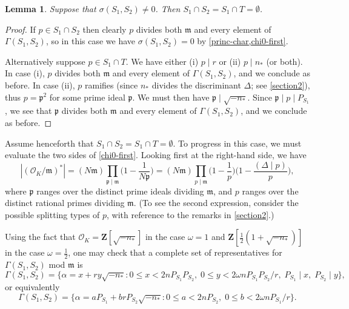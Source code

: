 \documentclass[11pt,reqno]{amsart}
\numberwithin{equation}{section}
\newtheorem{lemma}[theorem]{Lemma}
\theoremstyle{definition}
\theoremstyle{remark}
\newcommand{\mf}{\mathfrak}
\renewcommand{\le}{\leqslant}
\newcommand\Z{\mathbf{Z}}
\newcommand{\legendre}[2]{(#1 \mid #2)}
\renewcommand\O{\mathcal{O}}
\begin{document}
\begin{lemma}\label{es1s2-small-lemma}
Suppose that $\sigma(S_1, S_2) \neq 0$. Then $S_1 \cap S_2  = S_1 \cap T = \emptyset$.
\end{lemma}
\begin{proof}
If $p \in S_1 \cap S_2$ then clearly $p$ divides both $\mf{m}$ and every element of $\Gamma(S_1, S_2)$, so in this case we have $\sigma(S_1, S_2) = 0$ by \cref{princ-char,chi0-first}.

Alternatively suppose $p \in S_1 \cap T$.  We have either (i) $p \mid r$ or (ii) $p \mid n_*$ (or both). In case (i), $p$ divides both $\mf{m}$ and every element of $\Gamma(S_1, S_2)$, and we conclude as before. In case (ii), $p$ ramifies (since $n_*$ divides the discriminant $\Delta$; see \cref{section2}), thus $p = \mf{p}^2$ for some prime ideal $\mf{p}$. We must then have $\mf{p} \mid \sqrt{-n_*}$. Since $\mf{p} \mid p \mid P_{S_1}$, we see that $\mf{p}$ divides both $\mf{m}$ and every element of $\Gamma(S_1, S_2)$, and we conclude as before.
\end{proof}

Assume henceforth that $S_1 \cap S_2 = S_1 \cap T = \emptyset$. To progress in this case, we must evaluate the two sides of \cref{chi0-first}. Looking first at the right-hand side, we have 
\begin{equation}\label{chinese-rem}
 |(\O_K/\mf{m})^*|  =  (N\mf{m})  \prod_{\mf{p} \mid \mf{m}} \Big(1 - \frac{1}{N\mf{p}}\Big) = (N\mf{m}) \prod_{p \mid \mf{m}} \Big(1 - \frac{1}{p}\Big) \bigg(1 - \frac{\legendre{\Delta}{p}}{p}\bigg),
 \end{equation} where $\mf{p}$ ranges over the distinct prime ideals dividing $\mf{m}$, and $p$ ranges over the distinct rational primes dividing $\mf{m}$. (To see the second expression, consider the possible splitting types of $p$, with reference to the remarks in \cref{section2}.)
 
Using the fact that $\O_K = \Z[\sqrt{-n_*}]$ in the case $\omega = 1$ and $\Z[\frac{1}{2}(1 + \sqrt{-n_*})]$ in the case $\omega = \frac{1}{2}$, one may check that a complete set of representatives for $\Gamma(S_1, S_2)$ mod $\mf{m}$ is
\[ \Gamma(S_1, S_2) = \{ \alpha = x + ry \sqrt{-n_*} : 0 \le x < 2n P_{S_1} P_{S_2}, \; 0 \le y < 2\omega  nP_{S_1} P_{S_2}/ r, \; P_{S_1} \mid x, \; P_{S_2} \mid y\},\] or equivalently
\begin{equation}\label{gs1s2-explicit} \Gamma(S_1, S_2) = \{ \alpha = aP_{S_1} + br P_{S_2} \sqrt{-n_*} : 0 \le a < 2n P_{S_2}, \; 0 \le b < 2\omega n P_{S_1}/r\}.\end{equation} 
\end{document}
